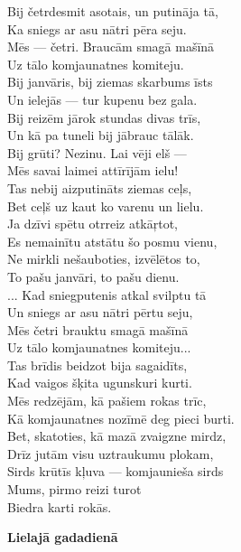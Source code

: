 \documentclass[14pt]{extarticle}
\begin{document}
{{Bij četrdesmit asotais, un putināja tā,\\
Ka sniegs ar asu nātri pēra seju.\\
Mēs --- četri. Braucām smagā mašīnā\\
Uz tālo komjaunatnes komiteju.\\
Bij janvāris, bij ziemas skarbums īsts\\
Un ielejās --- tur kupenu bez gala.\\
Bij reizēm jārok stundas divas trīs,\\
Un kā pa tuneli bij jābrauc tālāk.\\
Bij grūti? Nezinu. Lai vēji elš ---\\
Mēs savai laimei attīrījām ielu!\\
Tas nebij aizputināts ziemas ceļs,\\
Bet ceļš uz kaut ko varenu un lielu.\\
Ja dzīvi spētu otrreiz atkāŗtot,\\
Es nemainītu atstātu šo posmu vienu,\\
Ne mirkli nešauboties, izvēlētos to,\\
To pašu janvāri, to pašu dienu.\\
... Kad sniegputenis atkal svilptu tā\\
Un sniegs ar asu nātri pērtu seju,\\
Mēs četri brauktu smagā mašīnā\\
Uz tālo komjaunatnes komiteju...\\
\mbox{}\hspace{10pt}Tas brīdis beidzot bija sagaidīts,\\
Kad vaigos šķita ugunskuri kurti.\\
Mēs redzējām, kā pašiem rokas trīc,\\
Kā komjaunatnes nozīmē deg pieci burti.\\
Bet, skatoties, kā mazā zvaigzne mirdz,\\
Drīz jutām visu uztraukumu plokam,\\
Sirds krūtīs kļuva --- komjaunieša sirds\\
Mums, pirmo reizi turot\\
Biedra karti rokās. 


\newpage

{\bf Lielajā gadadienā}

}}
\end{document}
